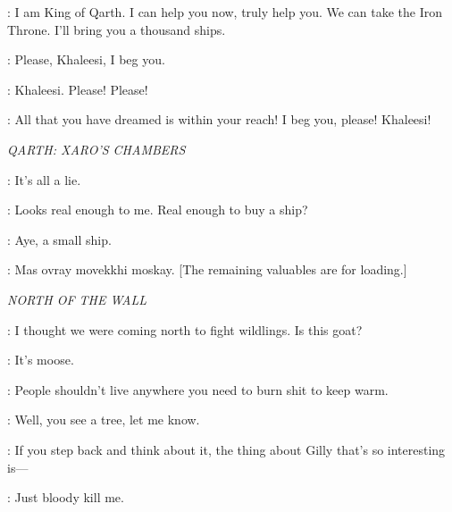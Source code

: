 
\XARO: I am King of Qarth. I can help you now, truly help you.  We can take the Iron Throne. I'll bring you a thousand ships. 

\DOREAH:  Please, Khaleesi, I beg you. 


\DOREAH: Khaleesi. Please! Please! 

\XARO: All that you have dreamed is within your reach! I beg you, please!  Khaleesi! 

\scene

\textit{QARTH: XARO'S CHAMBERS} 


\JORAH: It's all a lie. 

\DAENERYS: Looks real enough to me.  Real enough to buy a ship? 

\JORAH: Aye, a small ship. 


\JORAH:  Mas ovray movekkhi moskay. [The remaining valuables are for loading.] 



\scene

\textit{NORTH OF THE WALL} 


\GRENN: I thought we were coming north to fight wildlings.  Is this goat? 

\EDD: It's moose.  

\GRENN: People shouldn't live anywhere you need to burn shit to keep warm. 

\EDD: Well, you see a tree, let me know. 

\SAM: If you step back and think about it, the thing about Gilly that's so interesting is---  

\EDD:  Just bloody kill me. 


